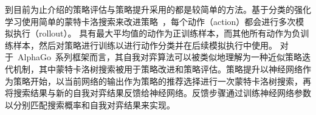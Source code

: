 到目前为止介绍的策略评估与策略提升采用的都是较简单的方法。基于分类的强化学习使用简单的蒙特卡洛搜索来改进策略~\cite{RLC}，每个动作（action）都会进行多次模拟执行（rollout）。 具有最大平均值的动作为正训练样本，而其他所有动作为负训练样本，然后对策略进行训练以进行动作分类并在后续模拟执行中使用。
对于~AlphaGo~系列框架而言，其自我对弈算法可以被类似地理解为一种近似策略迭代机制，其中蒙特卡洛树搜索被用于策略改进和策略评估。策略提升以神经网络作为策略开始，以当前网络的输出作为策略的推荐选择进行一次蒙特卡洛树搜索，再将搜索结果与新的自我对弈结果反馈给神经网络。反馈步骤通过训练神经网络参数以分别匹配搜索概率和自我对弈结果来实现。
